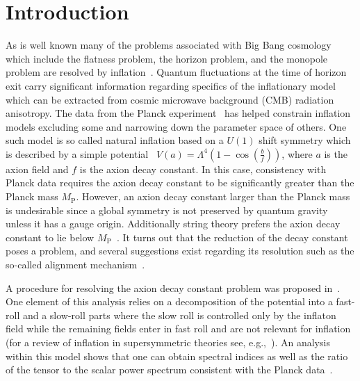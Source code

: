 \documentclass[12pt]{article}
\begin{document}
\section{Introduction \label{sec:Introduction}}
As is well known many of the problems associated with Big Bang cosmology which include
the flatness problem, the horizon problem, and the monopole problem are resolved by inflation~\cite{Guth:1980zm, Starobinsky:1980te, Linde:1981mu, Albrecht:1982wi, Sato:1980yn, Linde:1983gd}.
Quantum fluctuations at the time of horizon exit carry significant information regarding specifics of the inflationary model~\cite{Mukhanov:1981xt, Hawking:1982cz, Starobinsky:1982ee, Guth:1982ec, Bardeen:1983qw, Cheung:2007st} which can be extracted from cosmic microwave background (CMB) radiation anisotropy.
The data from the Planck experiment~\cite{Adam:2015rua, Ade:2015lrj, Array:2015xqh} has helped constrain inflation models excluding some and narrowing down the parameter space of others.
One such model is so called natural inflation based on a $U(1)$ shift symmetry which is described by a simple potential~\cite{Freese:1990rb, Adams:1992bn} $V\left(a\right) = \Lambda^4 \left(1 - \cos\left(\frac{b}{f}\right)\right)$, where $a$ is the axion field and $f$ is the axion decay constant.
In this case, consistency with Planck data requires the axion decay constant to be significantly greater than the Planck mass $M_\text{P}$.
However, an axion decay constant larger than the Planck mass is undesirable since a global symmetry is not preserved by quantum gravity unless it has a gauge origin.
Additionally string theory prefers the axion decay constant to lie below $M_\text{P}$~\cite{Banks:2003sx, Svrcek:2006yi}.
It turns out that the reduction of the decay constant poses a problem, and several suggestions exist regarding its resolution such as the so-called alignment mechanism~\cite{Kim:2004rp, Long:2014dta}.

A procedure for resolving the axion decay constant problem was proposed in~\cite{Nath:2017ihp}.
One element of this analysis relies on a decomposition of the potential into a fast-roll and a slow-roll parts where the slow roll is controlled only by the inflaton field while the remaining fields enter in fast roll and are not relevant for inflation~\cite{Nath:2017ihp} (for a review of inflation in supersymmetric theories see, e.g.,~\cite{Nath:2016qzm}).
An analysis within this model shows that one can obtain spectral indices as well as the ratio of the tensor to the scalar power spectrum consistent with the Planck data~\cite{Adam:2015rua, Ade:2015lrj, Array:2015xqh}.
\end{document}
